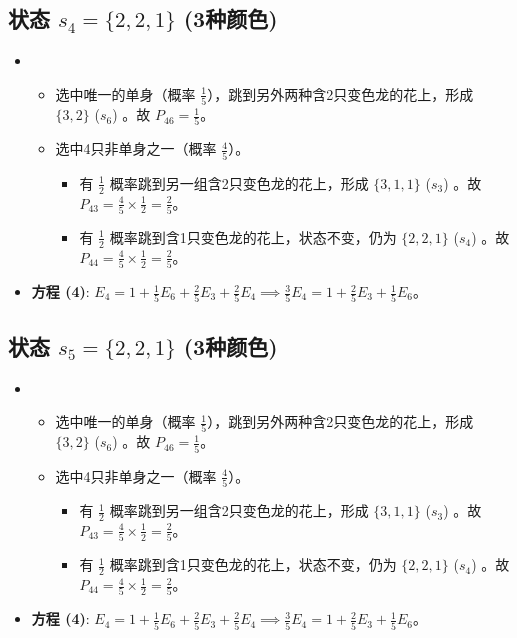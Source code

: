 \documentclass[UTF8]{ctexart}
\begin{document}
\subsection*{状态 $s_4 = \{2, 2, 1\}$ (3种颜色)}
\begin{itemize}
    \item 
        \begin{itemize}
            \item 选中唯一的单身（概率 $\frac{1}{5}$），跳到另外两种含2只变色龙的花上，形成 $\{3,2\}$ ($s_6$) 。故 $P_{46} = \frac{1}{5}$。
            \item 选中4只非单身之一（概率 $\frac{4}{5}$）。
                \begin{itemize}
                    \item 有 $\frac{1}{2}$ 概率跳到另一组含2只变色龙的花上，形成 $\{3,1,1\}$ ($s_3$) 。故 $P_{43} = \frac{4}{5} \times \frac{1}{2} = \frac{2}{5}$。
                    \item 有 $\frac{1}{2}$ 概率跳到含1只变色龙的花上，状态不变，仍为 $\{2,2,1\}$ ($s_4$) 。故 $P_{44} = \frac{4}{5} \times \frac{1}{2} = \frac{2}{5}$。
                \end{itemize}
        \end{itemize}
    \item \textbf{方程 (4)}: $E_4 = 1 + \frac{1}{5}E_6 + \frac{2}{5}E_3 + \frac{2}{5}E_4 \implies \frac{3}{5}E_4 = 1 + \frac{2}{5}E_3 + \frac{1}{5}E_6$。
\end{itemize}

\subsection*{状态 $s_5 = \{2, 2, 1\}$ (3种颜色)}
\begin{itemize}
    \item 
        \begin{itemize}
            \item 选中唯一的单身（概率 $\frac{1}{5}$），跳到另外两种含2只变色龙的花上，形成 $\{3,2\}$ ($s_6$) 。故 $P_{46} = \frac{1}{5}$。
            \item 选中4只非单身之一（概率 $\frac{4}{5}$）。
                \begin{itemize}
                    \item 有 $\frac{1}{2}$ 概率跳到另一组含2只变色龙的花上，形成 $\{3,1,1\}$ ($s_3$) 。故 $P_{43} = \frac{4}{5} \times \frac{1}{2} = \frac{2}{5}$。
                    \item 有 $\frac{1}{2}$ 概率跳到含1只变色龙的花上，状态不变，仍为 $\{2,2,1\}$ ($s_4$) 。故 $P_{44} = \frac{4}{5} \times \frac{1}{2} = \frac{2}{5}$。
                \end{itemize}
        \end{itemize}
    \item \textbf{方程 (4)}: $E_4 = 1 + \frac{1}{5}E_6 + \frac{2}{5}E_3 + \frac{2}{5}E_4 \implies \frac{3}{5}E_4 = 1 + \frac{2}{5}E_3 + \frac{1}{5}E_6$。
\end{itemize}
\end{document}
